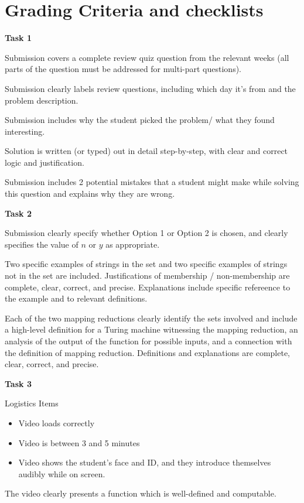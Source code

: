 	
\section{Grading Criteria and checklists}

{\bf Task 1}

Submission covers a complete review quiz question from the relevant weeks 
(all parts of the question must be addressed for multi-part questions).

Submission clearly labels review questions, including which day it's from and the problem description.

Submission includes why the student picked the problem/ what they found interesting.

Solution is written (or typed) out in detail step-by-step, with clear and correct logic and justification.

Submission includes 2 potential mistakes that a student might make while solving this question 
and explains why they are wrong.


{\bf Task 2}

Submission clearly specify whether Option 1 or Option 2 is chosen, and clearly specifies the value of $n$ or $y$ as appropriate.

Two specific examples of strings in the set and two specific examples 
of strings not in the set are included. Justifications of membership / non-membership are complete, clear, correct, and precise.
Explanations include specific refereence to the example and to relevant definitions.

Each of the two mapping reductions clearly identify the sets involved and include a high-level definition for
a Turing machine witnessing the mapping reduction, an analysis of the output of the function for possible inputs, and
a connection with the definition of mapping reduction. Definitions and explanations are complete, clear, correct, and precise.	


{\bf Task 3}

Logistics Items
\begin{itemize}
    \item Video loads correctly
    \item Video is between 3 and 5 minutes
    \item Video shows the student's face and ID, and they 
	introduce themselves audibly while on screen.
\end{itemize}

The video clearly presents a function which is well-defined and computable.

